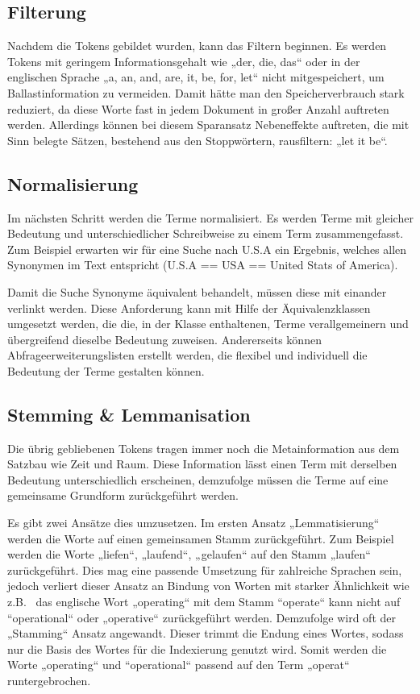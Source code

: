 \subsection[Filterung]{Filterung}

Nachdem die Tokens gebildet wurden, kann das Filtern beginnen. Es werden
Tokens mit geringem Informationsgehalt wie „der, die, das“ oder in der
englischen Sprache „a, an, and, are, it, be, for, let“ nicht
mitgespeichert, um Ballastinformation zu vermeiden. Damit hätte man den
Speicherverbrauch stark reduziert, da diese Worte fast in jedem
Dokument in großer Anzahl auftreten werden. Allerdings können bei
diesem Sparansatz Nebeneffekte auftreten, die mit Sinn belegte Sätzen,
bestehend aus den Stoppwörtern, rausfiltern: „let it be“. 

\subsection[Normalisierung ]{Normalisierung }


Im nächsten Schritt werden die Terme normalisiert. Es werden Terme mit
gleicher Bedeutung und unterschiedlicher Schreibweise zu einem Term
zusammengefasst. Zum Beispiel erwarten wir für eine Suche nach U.S.A
ein Ergebnis, welches allen Synonymen im Text entspricht (U.S.A == USA
== United Stats of America). 

Damit die Suche Synonyme äquivalent behandelt, müssen diese mit einander
verlinkt werden. Diese Anforderung kann mit Hilfe der Äquivalenzklassen
umgesetzt werden, die die, in der Klasse enthaltenen, Terme
verallgemeinern und übergreifend dieselbe Bedeutung zuweisen.
Andererseits können Abfrageerweiterungslisten erstellt werden, die
flexibel und individuell die Bedeutung der Terme gestalten können.


\subsection[Stemming \& Lemmanisation]{Stemming \& Lemmanisation}

Die übrig gebliebenen Tokens tragen immer noch die Metainformation aus
dem Satzbau wie Zeit und Raum. Diese Information lässt einen Term mit
derselben Bedeutung unterschiedlich erscheinen, demzufolge müssen die
Terme auf eine gemeinsame Grundform zurückgeführt werden. 


Es gibt zwei Ansätze dies umzusetzen. Im ersten Ansatz „Lemmatisierung“
werden die Worte auf einen gemeinsamen Stamm zurückgeführt. Zum
Beispiel werden die Worte „liefen“, „laufend“, „gelaufen“ auf den Stamm
„laufen“ zurückgeführt. Dies mag eine passende Umsetzung für zahlreiche
Sprachen sein, jedoch verliert dieser Ansatz an Bindung von Worten mit
starker Ähnlichkeit wie z.B. \ das englische Wort „operating“ mit dem
Stamm “operate“ kann nicht auf “operational“ oder „operative“
zurückgeführt werden. Demzufolge wird oft der „Stamming“ Ansatz
angewandt. Dieser trimmt die Endung eines Wortes, sodass nur die Basis
des Wortes für die Indexierung genutzt wird. Somit werden die Worte
„operating“ und “operational“ passend auf den Term „operat“
runtergebrochen.


